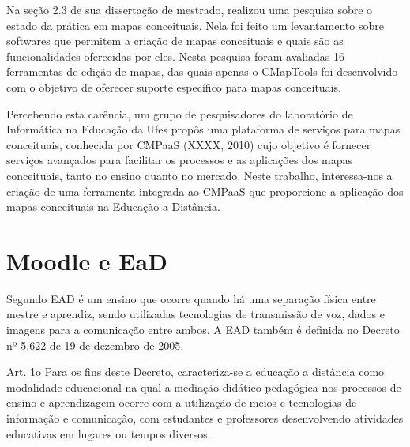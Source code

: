 \documentclass[
	12pt,				%
	openright,			%
	oneside,			%
	a4paper,			%
	english,			%
	french,				%
	spanish,			%
	brazil				%
	]{abntex2}
\begin{document}
Na seção 2.3 de sua dissertação de mestrado,  realizou uma pesquisa sobre o estado da prática em mapas conceituais. Nela foi feito um levantamento sobre softwares que permitem a criação de mapas conceituais e quais são as funcionalidades oferecidas por eles. Nesta pesquisa foram avaliadas 16 ferramentas de edição de mapas, das quais apenas o CMapTools foi desenvolvido com o objetivo de oferecer suporte específico para mapas conceituais.

Percebendo esta carência, um grupo de pesquisadores do laboratório de Informática na Educação da Ufes propôs uma plataforma de serviços para mapas conceituais, conhecida por CMPaaS (XXXX, 2010) cujo objetivo é fornecer serviços avançados para facilitar os processos e as aplicações dos mapas conceituais, tanto no ensino quanto no mercado. Neste trabalho, interessa-nos a criação de uma ferramenta integrada ao CMPaaS que proporcione a aplicação dos mapas conceituais na Educação a Distância. 
  




\section{Moodle e EaD}\label{cap-ead}

Segundo  EAD é um ensino que ocorre quando há uma separação física entre mestre e aprendiz, sendo utilizadas tecnologias de transmissão de voz, dados e imagens para a comunicação entre ambos. A EAD também é definida no Decreto nº 5.622 de 19 de dezembro de 2005\cite{BRASIL2005}.
 \begin{citacao}
 	Art. 1o  Para os fins deste Decreto, caracteriza-se a educação a distância como modalidade educacional na qual a mediação didático-pedagógica nos processos de ensino e aprendizagem ocorre com a utilização de meios e tecnologias de informação e comunicação, com estudantes e professores desenvolvendo atividades educativas em lugares ou tempos diversos\cite{BRASIL2005}.
 \end{citacao}
 
\end{document}
